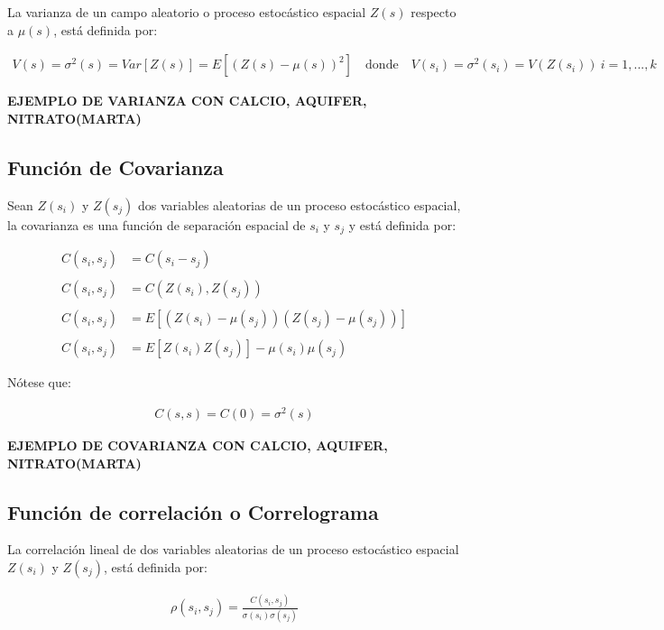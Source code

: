 \documentclass[
]{book}
\begin{document}
La varianza de un campo aleatorio o proceso estocástico espacial \(Z(s)\) respecto a \(\mu(s)\), está definida por:

\begin{align}
  V(s)=\sigma^2(s)=Var[Z(s)]=E[(Z(s)-\mu(s))^2]\quad \text{donde} \quad V(s_i)=\sigma^2(s_i)=V(Z(s_i))\ i=1,...,k
\end{align}

\textbf{EJEMPLO DE VARIANZA CON CALCIO, AQUIFER, NITRATO(MARTA)}

\hypertarget{funciuxf3n-de-covarianza}{%
\subsection{Función de Covarianza}\label{funciuxf3n-de-covarianza}}

Sean \(Z(s_i)\) y \(Z(s_j)\) dos variables aleatorias de un proceso estocástico espacial, la covarianza es una función de separación espacial de \(s_i\) y \(s_j\) y está definida por:

\begin{align}
  C(s_i,s_j)&=C(s_i-s_j)\\ \\
  C(s_i,s_j)&=C(Z(s_i),Z(s_j))\\ \\
  C(s_i,s_j)&=E[(Z(s_i)-\mu(s_j))(Z(s_j)-\mu(s_j))]\\ \\
  C(s_i,s_j)&=E[Z(s_i)Z(s_j)]-\mu(s_i)\mu(s_j)
\end{align}

Nótese que:

\begin{align}
  C(s,s)=C(0)=\sigma^2(s)  
\end{align}

\textbf{EJEMPLO DE COVARIANZA CON CALCIO, AQUIFER, NITRATO(MARTA)}

\hypertarget{funciuxf3n-de-correlaciuxf3n-o-correlograma}{%
\subsection{Función de correlación o Correlograma}\label{funciuxf3n-de-correlaciuxf3n-o-correlograma}}

La correlación lineal de dos variables aleatorias de un proceso estocástico espacial \(Z(s_i)\) y \(Z(s_j)\), está definida por:

\begin{align}
  \rho(s_i,s_j)=\frac{C(s_i,s_j)}{\sigma(s_i)\sigma(s_j)}  
\end{align}
\end{document}
